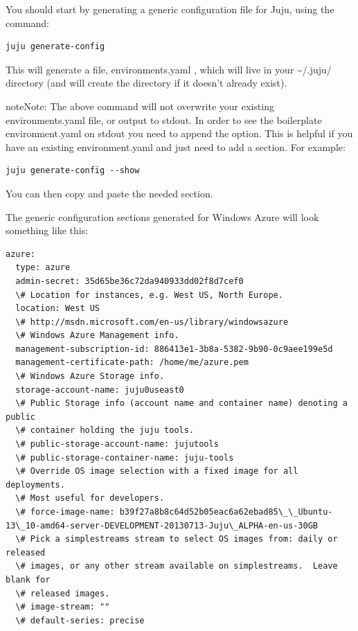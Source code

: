 \documentclass[letterpaper,10pt,english]{sphinxmanual}
\begin{document}
You should start by generating a generic configuration file for Juju,
using the command:

\begin{Verbatim}[commandchars=\\\{\}]
juju generate-config
\end{Verbatim}

This will generate a file, environments.yaml , which will live in your
\textasciitilde{}/.juju/ directory (and will create the directory if it doesn't
already exist).

\begin{notice}{note}{Note:}
The above command will not overwrite your existing
environments.yaml file, or output to stdout. In order to see the
boilerplate environment.yaml on stdout you need to append the 
option. This is helpful if you have an existing environment.yaml and
just need to add a section. For example:
\end{notice}

\begin{Verbatim}[commandchars=\\\{\}]
juju generate-config --show
\end{Verbatim}

You can then copy and paste the needed section.

The generic configuration sections generated for Windows Azure will
look something like this:

\begin{Verbatim}[commandchars=\\\{\}]
azure:
  type: azure
  admin-secret: 35d65be36c72da940933dd02f8d7cef0
  \# Location for instances, e.g. West US, North Europe.
  location: West US
  \# http://msdn.microsoft.com/en-us/library/windowsazure
  \# Windows Azure Management info.
  management-subscription-id: 886413e1-3b8a-5382-9b90-0c9aee199e5d
  management-certificate-path: /home/me/azure.pem
  \# Windows Azure Storage info.
  storage-account-name: juju0useast0
  \# Public Storage info (account name and container name) denoting a public
  \# container holding the juju tools.
  \# public-storage-account-name: jujutools
  \# public-storage-container-name: juju-tools
  \# Override OS image selection with a fixed image for all deployments.
  \# Most useful for developers.
  \# force-image-name: b39f27a8b8c64d52b05eac6a62ebad85\_\_Ubuntu-13\_10-amd64-server-DEVELOPMENT-20130713-Juju\_ALPHA-en-us-30GB
  \# Pick a simplestreams stream to select OS images from: daily or released
  \# images, or any other stream available on simplestreams.  Leave blank for
  \# released images.
  \# image-stream: ""
  \# default-series: precise
\end{Verbatim}
\end{document}
